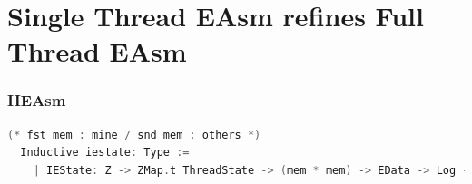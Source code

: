 

\section{Single Thread EAsm refines Full Thread EAsm}

\subsubsection{IIEAsm}
\begin{lstlisting}[language=C]
  (* fst mem : mine / snd mem : others *)
  Inductive iestate: Type :=
    | IEState: Z -> ZMap.t ThreadState -> (mem * mem) -> EData -> Log -> iestate.
\end{lstlisting}

